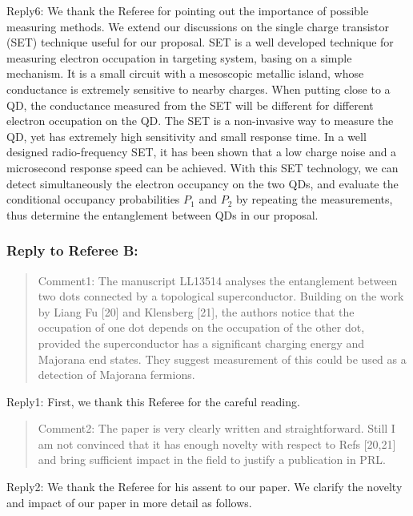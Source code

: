 \documentclass[11pt]{article}
\begin{document}
Reply6: We thank the Referee for pointing out the importance of possible
measuring methods. We extend our discussions on the single charge
transistor (SET) technique useful for our proposal. SET is a well
developed technique for measuring electron occupation in targeting
system, basing on a simple mechanism. It is a small circuit with a
mesoscopic metallic island, whose conductance is extremely sensitive to
nearby charges. When putting close to a QD, the conductance measured
from the SET will be different for different electron occupation on the
QD. The SET is a non-invasive way to measure the QD, yet has extremely
high sensitivity and small response time. In a well designed
radio-frequency SET, it has been shown that a low charge noise and a
microsecond response speed can be achieved. With this SET technology, we
can detect simultaneously the electron occupancy on the two QDs, and
evaluate the conditional occupancy probabilities \(P_1\) and \(P_2\) by
repeating the measurements, thus determine the entanglement between QDs
in our proposal.

\hypertarget{reply-to-referee-b}{%
\subsubsection{Reply to Referee B:}\label{reply-to-referee-b}}

\begin{quote}
Comment1: The manuscript LL13514 analyses the entanglement between two
dots connected by a topological superconductor. Building on the work by
Liang Fu {[}20{]} and Klensberg {[}21{]}, the authors notice that the
occupation of one dot depends on the occupation of the other dot,
provided the superconductor has a significant charging energy and
Majorana end states. They suggest measurement of this could be used as a
detection of Majorana fermions.
\end{quote}

Reply1: First, we thank this Referee for the careful reading.

\begin{quote}
Comment2: The paper is very clearly written and straightforward. Still I
am not convinced that it has enough novelty with respect to Refs
{[}20,21{]} and bring sufficient impact in the field to justify a
publication in PRL.
\end{quote}

Reply2: We thank the Referee for his assent to our paper. We clarify the
novelty and impact of our paper in more detail as follows.
\end{document}
